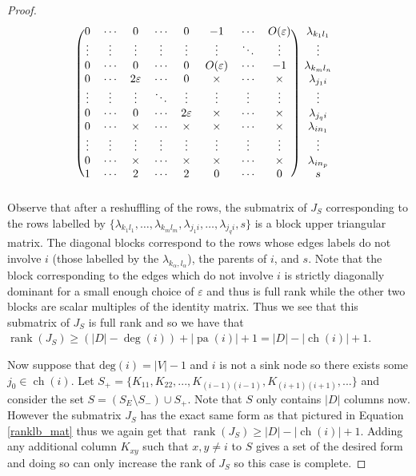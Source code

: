 \documentclass[12pt,reqno]{amsart}
\theoremstyle{plain}
\theoremstyle{definition}
\DeclareMathOperator{\pa}{pa}
\DeclareMathOperator{\ch}{ch}
\DeclareMathOperator{\rank}{rank}
\begin{document}
\begin{proof}
\begin{align}
\begin{blockarray}{ccccccccc}
\begin{block}{(cccccccc)c}
  0 & \cdots & 0 & \cdots & 0 & -1 &\cdots & O(\varepsilon) & \lambda_{k_1 l_1}\\
  \vdots & \vdots & \vdots & \vdots & \vdots & \vdots &\ddots &\vdots & \vdots \\
  0 & \cdots & 0 & \cdots & 0 & O(\varepsilon) & \cdots &-1 & \lambda_{k_m l_n}\\
  0 & \cdots & 2\varepsilon & \cdots & 0 & \times & \cdots &\times & \lambda_{j_1 i}\\
  \vdots & \vdots & \vdots & \ddots & \vdots & \vdots & \vdots & \vdots & \vdots\\
  0 & \cdots & 0 & \cdots & 2\varepsilon & \times &\cdots &\times & \lambda_{j_q i}\\
  0 & \cdots & \times & \cdots & \times &\times & \cdots & \times & \lambda_{i n_1}\\
  \vdots & \vdots & \vdots & \vdots & \vdots &\vdots & \vdots & \vdots & \vdots\\
  0 & \cdots & \times & \cdots & \times &\times & \cdots & \times & \lambda_{i n_p} \\
  1 & \cdots & 2 & \cdots & 2 & 0 & \cdots & 0 & s\\
\end{block}
\end{blockarray}
\end{align}
Observe that after a reshuffling of the rows, the submatrix of $J_S$ corresponding to the rows labelled by 
$\{\lambda_{k_1 l_1}, \ldots, \lambda_{k_m l_m}, \lambda_{j_1 i}, \ldots, \lambda_{j_q i}, s\}$ is a block upper triangular matrix. The diagonal blocks correspond to the rows whose edges labels do not involve $i$ (those labelled by the $\lambda_{k_\alpha, l_\alpha}$), the parents of $i$, and $s$. Note that the block corresponding to the edges which do not involve $i$ is strictly diagonally dominant for a small enough choice of $\varepsilon$ and thus is full rank while the other two blocks are scalar multiples of the identity matrix. Thus we see that this submatrix of $J_S$ is full rank and so we have that 
$\rank(J_S) \geq (|D| -\deg(i)) + |\pa(i)| + 1 = |D| - |\ch(i)| + 1$. 


Now suppose that $\text{deg}(i)=|V|-1$ and $i$ is not a sink node so there exists some $j_0 \in \ch(i)$. Let $S_+ = \{K_{11},K_{22},...,K_{(i-1)(i-1)},K_{(i+1)(i+1)},...\}$ and consider the set $S = (S_E \setminus S_-) \cup S_+$. Note that $S$ only contains $|D|$ columns now. However the submatrix $J_S$ has the exact same form as that pictured in Equation \ref{ranklb_mat} thus we again get that $\rank(J_S) \geq |D| - |\ch(i)|+1$.  Adding any additional column $K_{x y}$ such that $x,y \neq i$ to $S$ gives a set of the desired form and doing so can only increase the rank of $J_S$ so this case is complete. 


\end{proof}
\end{document}
